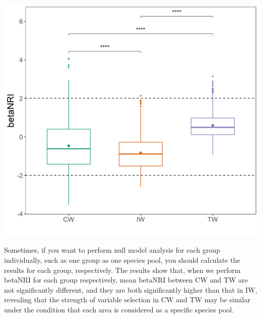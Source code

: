 \documentclass[
]{book}
\begin{document}
\begin{center}\includegraphics[width=550px]{Images/plot_betaNRI_one_dataset} \end{center}

Sometimes, if you want to perform null model analysis for each group individually, such as one group as one species pool,
you should calculate the results for each group, respectively.
The results show that, when we perform betaNRI for each group respectively,
mean betaNRI between CW and TW are not significantly different, and they are both significantly higher than that in IW,
revealing that the strength of variable selection in CW and TW may be similar under the condition that each area is considered as a specific species pool.
\end{document}
